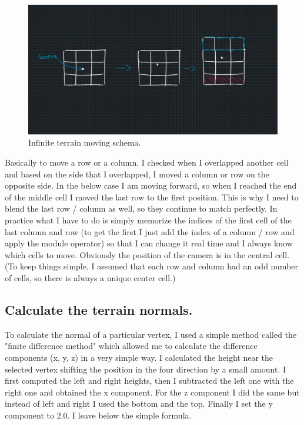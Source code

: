 \begin{figure}[hbt!]
	\centering
	\includegraphics[width= 1
	\textwidth]{images/infiniteTerrainSchema.jpg}
	\caption{Infinite terrain moving schema.}
\end{figure} 

\noindent
Basically to move a row or a column, I checked when I overlapped another cell and based on the side that I overlapped, I moved a column or row on the opposite side. In the below case I am moving forward, so when I reached the end of the middle cell I moved the last row to the first position. This is why I need to blend the last row / column as well, so they continue to match perfectly.
In practice what I have to do is simply memorize the indices of the first cell of the last column and row (to get the first I just add the index of a column / row and apply the module operator) so that I can change it real time and I always know which cells to move.
Obviously the position of the camera is in the central cell. (To keep things simple, I assumed that each row and column had an odd number of cells, so there is always a unique center cell.)

\subsection{Calculate the terrain normals.}
To calculate the normal of a particular vertex, I used a simple method called the "finite difference method" which allowed me to calculate the difference components  (x, y, z) in a very simple way. I calculated the height near the selected vertex shifting the position in the four direction by a small amount. I first computed the left and right heights, then I subtracted the left one with the right one and obtained the x component. For the z component I did the same but instead of left and right I used the bottom and the top. Finally I set the y component to 2.0. I leave below the simple formula.

